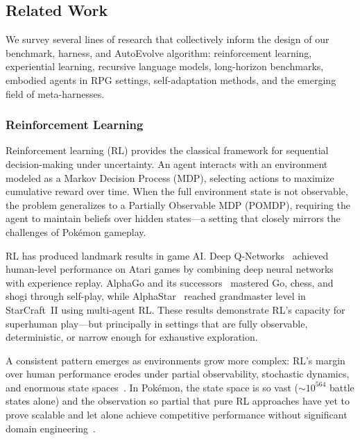 
\subsection{Related Work}\label{sec:related_work}

We survey several lines of research that collectively inform the design of our benchmark, harness, and AutoEvolve algorithm: reinforcement learning, experiential learning, recursive language models, long-horizon benchmarks, embodied agents in RPG settings, self-adaptation methods, and the emerging field of meta-harnesses.

\subsubsection{Reinforcement Learning}\label{sec:rl}

Reinforcement learning (RL) provides the classical framework for sequential decision-making under uncertainty. An agent interacts with an environment modeled as a Markov Decision Process (MDP), selecting actions to maximize cumulative reward over time. When the full environment state is not observable, the problem generalizes to a Partially Observable MDP (POMDP), requiring the agent to maintain beliefs over hidden states---a setting that closely mirrors the challenges of Pok\'{e}mon gameplay.

RL has produced landmark results in game AI. Deep Q-Networks~\citep{mnih2015human} achieved human-level performance on Atari games by combining deep neural networks with experience replay. AlphaGo and its successors~\citep{silver2017mastering, silver2018general} mastered Go, chess, and shogi through self-play, while AlphaStar~\citep{vinyals2019grandmaster} reached grandmaster level in StarCraft~II using multi-agent RL. These results demonstrate RL's capacity for superhuman play---but principally in settings that are fully observable, deterministic, or narrow enough for exhaustive exploration.

A consistent pattern emerges as environments grow more complex: RL's margin over human performance erodes under partial observability, stochastic dynamics, and enormous state spaces~\citep{samuel1959, paglieri2024balrog}. In Pok\'{e}mon, the state space is so vast ($\sim\!10^{564}$ battle states alone) and the observation so partial that pure RL approaches have yet to prove scalable and let alone achieve competitive performance without significant domain engineering~\citep{pleines2025pokemon, grigsby2025human}.

